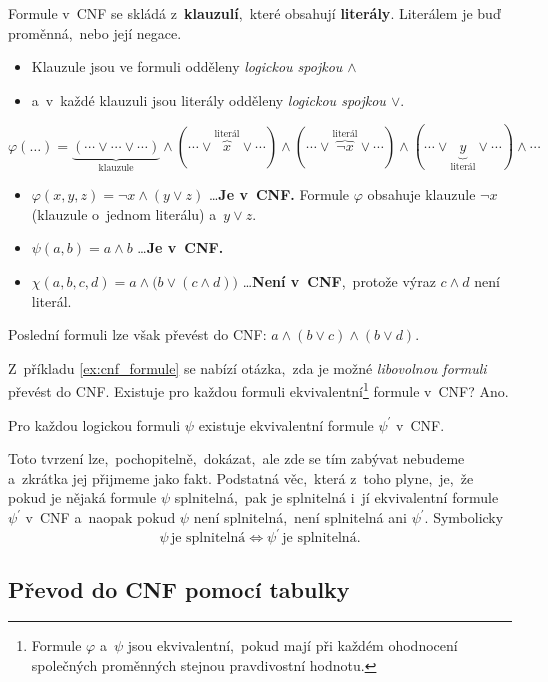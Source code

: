 Formule v~CNF se skládá z~\textbf{klauzulí},~které obsahují \textbf{literály}. Literálem je buď proměnná,~nebo její negace.
\begin{itemize}
    \item Klauzule jsou ve formuli odděleny \emph{logickou spojkou $\land$}
    \item a~v~každé klauzuli jsou literály odděleny \emph{logickou spojkou $\lor$}.
\end{itemize}
\[\varphi(\dots)=\underbrace{(\cdots\lor\cdots\lor\cdots)}_{\text{klauzule}}\land(\cdots\lor \overbrace{x}^{\text{literál}}\lor\cdots)\land(\cdots\lor\overbrace{\neg x}^{\text{literál}}\lor\cdots)\land(\cdots\lor \underbrace{y}_{\text{literál}}\lor\cdots)\land\cdots\]
\begin{example}\label{ex:cnf_formule}
    \begin{itemize}
        \item \(\varphi(x,y,z)=\neg x\land (y\lor z)\) \dots \textbf{Je v~CNF.} Formule $\varphi$ obsahuje klauzule $\neg x$ (klauzule o~jednom literálu) a~$y\lor z$.
        \item \(\psi(a,b)=a\land b\) \dots \textbf{Je v~CNF.}
        \item \(\chi(a,b,c,d)=a\land \big(b\lor (c\land d)\big)\) \dots \textbf{Není v~CNF},~protože výraz $c\land d$ není literál.
    \end{itemize}
    Poslední formuli lze však převést do CNF: $a\land (b\lor c)\land (b\lor d)$.
\end{example}
Z~příkladu \ref{ex:cnf_formule} se nabízí otázka,~zda je možné \emph{libovolnou formuli} převést do CNF. Existuje pro každou formuli ekvivalentní\footnote{Formule $\varphi$ a~$\psi$ jsou ekvivalentní,~pokud mají při každém ohodnocení společných proměnných stejnou pravdivostní hodnotu.} formule v~CNF? Ano.
\begin{theorem}
    Pro každou logickou formuli $\psi$ existuje ekvivalentní formule $\psi^\prime$ v~CNF.
\end{theorem}
Toto tvrzení lze,~pochopitelně,~dokázat,~ale zde se tím zabývat nebudeme a~zkrátka jej přijmeme jako fakt. Podstatná věc,~která z~toho plyne,~je,~že pokud je nějaká formule $\psi$ splnitelná,~pak je splnitelná i~jí ekvivalentní formule $\psi^\prime$ v~CNF a~naopak pokud $\psi$ není splnitelná,~není splnitelná ani $\psi^\prime$. Symbolicky
\[\psi\,\text{je splnitelná}\iff\psi^\prime\,\text{je splnitelná}.\]

\subsection{Převod do CNF pomocí tabulky}\label{subsec:cnf_prevod_tabulka}

